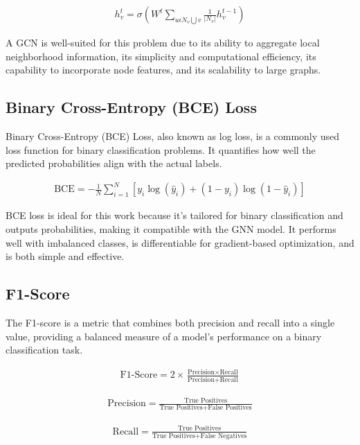 \documentclass{article}
\begin{document}
\begin{align}
  h_{v}^{t}=\sigma \left ( 
    W^t
    \sum_{u\epsilon N_v\bigcup v}
    \frac{1}{\left | N_v \right |} 
    h_{v}^{t-1}
    \right )
\end{align}

A GCN is well-suited for this problem due to its ability to aggregate local neighborhood information, its simplicity and computational efficiency, its capability to incorporate node features, and its scalability to large graphs.

\subsection{Binary Cross-Entropy (BCE) Loss}
\label{ssec:bce}

Binary Cross-Entropy (BCE)\cite{domingos2012few}  Loss, also known as log loss, is a commonly used loss function for binary classification problems. It quantifies how well the predicted probabilities align with the actual labels.

\begin{align}
  \text{BCE} = -\frac{1}{N} \sum_{i=1}^{N} [y_i \log(\hat{y}_i) + (1 - y_i) \log(1 - \hat{y}_i)]
\end{align}

BCE loss is ideal for this work because it's tailored for binary classification and outputs probabilities, making it compatible with the GNN model. It performs well with imbalanced classes, is differentiable for gradient-based optimization, and is both simple and effective.

\subsection{F1-Score}
\label{ssec:f1}

The F1-score is a metric that combines both precision and recall into a single value, providing a balanced measure of a model's performance on a binary classification task.

\begin{align}
  \text{F1-Score} = 2 \times \frac{\text{Precision} \times \text{Recall}}{\text{Precision} + \text{Recall}}
\end{align}

\begin{align}
  \text{Precision} = \frac{\text{True Positives}}{\text{True Positives} + \text{False Positives}}
\end{align}

\begin{align}
  \text{Recall} = \frac{\text{True Positives}}{\text{True Positives} + \text{False Negatives}}
\end{align}
\end{document}
